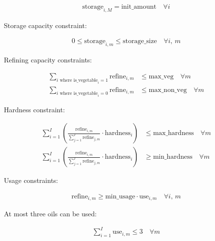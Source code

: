 \documentclass{article}
\begin{document}
\begin{equation}
\begin{aligned}
    \text{storage}_{i,M} = \text{init\_amount} \quad \forall i
\end{aligned}
\end{equation}

\noindent Storage capacity constraint:

\begin{equation}
\begin{aligned}
    0 \leq \text{storage}_{i,m} \leq \text{storage\_size} \quad \forall i, \, m
\end{aligned}
\end{equation}

\noindent Refining capacity constraints:

\begin{equation}
\begin{aligned}
    \sum_{i \text{ where } \text{is\_vegetable}_i = 1} \text{refine}_{i,m} & \leq \text{max\_veg} \quad \forall m \\
    \sum_{i \text{ where } \text{is\_vegetable}_i = 0} \text{refine}_{i,m} & \leq \text{max\_non\_veg} \quad \forall m
\end{aligned}
\end{equation}

\noindent Hardness constraint:

\begin{equation}
\begin{aligned}
    \sum_{i=1}^{I} \left( \frac{\text{refine}_{i,m}}{\sum_{j=1}^{I} \text{refine}_{j,m}} \cdot \text{hardness}_i \right) & \leq \text{max\_hardness} \quad \forall m \\
    \sum_{i=1}^{I} \left( \frac{\text{refine}_{i,m}}{\sum_{j=1}^{I} \text{refine}_{j,m}} \cdot \text{hardness}_i \right) & \geq \text{min\_hardness} \quad \forall m
\end{aligned}
\end{equation}

\noindent Usage constraints:

\begin{equation}
\begin{aligned}
    \text{refine}_{i,m} \geq \text{min\_usage} \cdot \text{use}_{i,m} \quad \forall i, \, m
\end{aligned}
\end{equation}

\noindent At most three oils can be used:

\begin{equation}
\begin{aligned}
    \sum_{i=1}^{I} \text{use}_{i,m} \leq 3 \quad \forall m
\end{aligned}
\end{equation}
\end{document}

